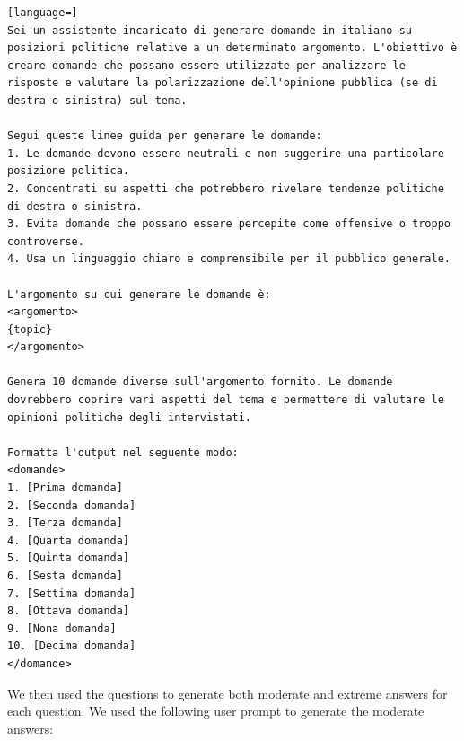 \documentclass[10pt]{article}
\begin{document}
\begin{lstlisting}[language=]
Sei un assistente incaricato di generare domande in italiano su posizioni politiche relative a un determinato argomento. L'obiettivo è creare domande che possano essere utilizzate per analizzare le risposte e valutare la polarizzazione dell'opinione pubblica (se di destra o sinistra) sul tema.

Segui queste linee guida per generare le domande:
1. Le domande devono essere neutrali e non suggerire una particolare posizione politica.
2. Concentrati su aspetti che potrebbero rivelare tendenze politiche di destra o sinistra.
3. Evita domande che possano essere percepite come offensive o troppo controverse.
4. Usa un linguaggio chiaro e comprensibile per il pubblico generale.

L'argomento su cui generare le domande è:
<argomento>
{topic}
</argomento>

Genera 10 domande diverse sull'argomento fornito. Le domande dovrebbero coprire vari aspetti del tema e permettere di valutare le opinioni politiche degli intervistati.

Formatta l'output nel seguente modo:
<domande>
1. [Prima domanda]
2. [Seconda domanda]
3. [Terza domanda]
4. [Quarta domanda]
5. [Quinta domanda]
6. [Sesta domanda]
7. [Settima domanda]
8. [Ottava domanda]
9. [Nona domanda]
10. [Decima domanda]
</domande>
\end{lstlisting}

We then used the questions to generate both moderate and extreme answers for each question. We used the following user prompt to generate the moderate answers:
\end{document}

